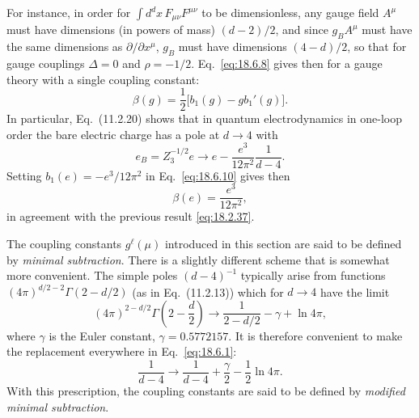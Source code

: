 For instance, in order for $\int d^d x\,F_{\mu\nu}F^{\mu\nu}$ to be dimensionless, any gauge field $A^\mu$ must have dimensions (in powers of mass) $(d-2)/2$, and since $g_BA^\mu$ must have the same dimensions as $\partial/\partial x^\mu$, $g_B$ must have dimensions $(4-d)/2$, so that for gauge couplings $\Delta=0$ and $\rho=-1/2$. Eq.~\eqref{eq:18.6.8} gives then for a gauge theory with a single coupling constant:
\begin{equation}
\beta(g)=\frac{1}{2}\bigl[b_1(g)-g b_1'(g)\bigr].
\tag{18.6.10}\label{eq:18.6.10}
\end{equation}
In particular, Eq.~(11.2.20) shows that in quantum electrodynamics in one-loop order the bare electric charge has a pole at $d\to4$ with
\begin{equation}
e_B=Z_3^{-1/2}e\to e-\frac{e^3}{12\pi^2}\frac{1}{d-4}.
\tag{18.6.11}\label{eq:18.6.11}
\end{equation}
Setting $b_1(e)=-e^3/12\pi^2$ in Eq.~\eqref{eq:18.6.10} gives then
\begin{equation}
\beta(e)=\frac{e^3}{12\pi^2},
\tag{18.6.12}\label{eq:18.6.12}
\end{equation}
in agreement with the previous result \eqref{eq:18.2.37}.

The coupling constants $g^\ell(\mu)$ introduced in this section are said to be defined by \emph{minimal subtraction}. There is a slightly different scheme that is somewhat more convenient. The simple poles $(d-4)^{-1}$ typically arise from functions $(4\pi)^{d/2-2}\Gamma(2-d/2)$ (as in Eq.~(11.2.13)) which for $d\to4$ have the limit
\begin{equation}
(4\pi)^{2-d/2}\Gamma\left(2-\frac{d}{2}\right)
\to\frac{1}{2-d/2}-\gamma+\ln4\pi,
\tag{18.6.13}\label{eq:18.6.13}
\end{equation}
where $\gamma$ is the Euler constant, $\gamma=0.5772157$. It is therefore convenient to make the replacement everywhere in Eq.~\eqref{eq:18.6.1}:
\begin{equation}
\frac{1}{d-4}\to\frac{1}{d-4}+\frac{\gamma}{2}-\frac{1}{2}\ln4\pi.
\tag{18.6.14}\label{eq:18.6.14}
\end{equation}
With this prescription, the coupling constants are said to be defined by \emph{modified minimal subtraction}.

